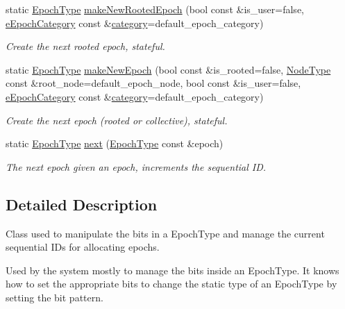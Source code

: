 \begin{DoxyCompactItemize}
static \hyperlink{namespacevt_a985a5adf291c34a3ca263b3378388236}{Epoch\+Type} \hyperlink{structvt_1_1epoch_1_1_epoch_manip_a78295c68a66b0ba88a1188e7e39b7d61}{make\+New\+Rooted\+Epoch} (bool const \&is\+\_\+user=false, \hyperlink{namespacevt_1_1epoch_a956abe0aceef0d10a988de8acb002c7c}{e\+Epoch\+Category} const \&\hyperlink{structvt_1_1epoch_1_1_epoch_manip_aa61d47033545df147c01036211c4cabe}{category}=default\+\_\+epoch\+\_\+category)
\begin{DoxyCompactList}\small\item\em Create the next rooted epoch, stateful. \end{DoxyCompactList}\item 
static \hyperlink{namespacevt_a985a5adf291c34a3ca263b3378388236}{Epoch\+Type} \hyperlink{structvt_1_1epoch_1_1_epoch_manip_ab744c3a392856694aa13a5c3a9da0841}{make\+New\+Epoch} (bool const \&is\+\_\+rooted=false, \hyperlink{namespacevt_a866da9d0efc19c0a1ce79e9e492f47e2}{Node\+Type} const \&root\+\_\+node=default\+\_\+epoch\+\_\+node, bool const \&is\+\_\+user=false, \hyperlink{namespacevt_1_1epoch_a956abe0aceef0d10a988de8acb002c7c}{e\+Epoch\+Category} const \&\hyperlink{structvt_1_1epoch_1_1_epoch_manip_aa61d47033545df147c01036211c4cabe}{category}=default\+\_\+epoch\+\_\+category)
\begin{DoxyCompactList}\small\item\em Create the next epoch (rooted or collective), stateful. \end{DoxyCompactList}\item 
static \hyperlink{namespacevt_a985a5adf291c34a3ca263b3378388236}{Epoch\+Type} \hyperlink{structvt_1_1epoch_1_1_epoch_manip_a6ae352a8b90f6dddbd76569cb7a47462}{next} (\hyperlink{namespacevt_a985a5adf291c34a3ca263b3378388236}{Epoch\+Type} const \&epoch)
\begin{DoxyCompactList}\small\item\em The next epoch given an epoch, increments the sequential ID. \end{DoxyCompactList}\end{DoxyCompactItemize}


\subsection{Detailed Description}
Class used to manipulate the bits in a {\ttfamily Epoch\+Type} and manage the current sequential I\+Ds for allocating epochs. 

Used by the system mostly to manage the bits inside an {\ttfamily Epoch\+Type}. It knows how to set the appropriate bits to change the static type of an {\ttfamily Epoch\+Type} by setting the bit pattern. 

